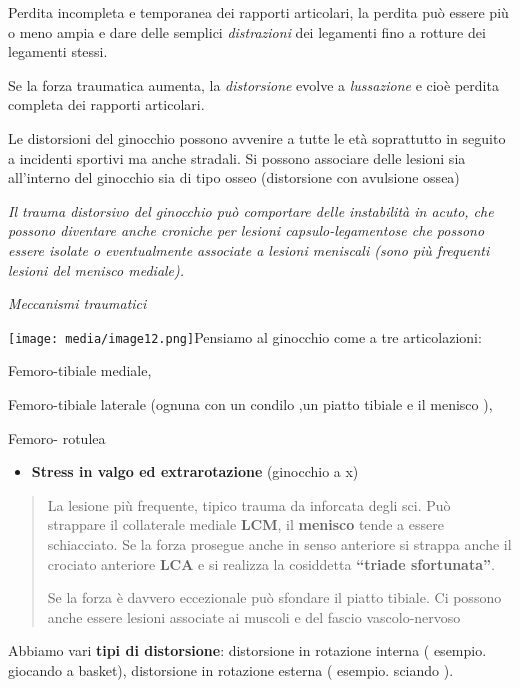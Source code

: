 \documentclass[]{article}
\begin{document}
Perdita incompleta e temporanea dei rapporti articolari, la perdita può
essere più o meno ampia e dare delle semplici \emph{distrazioni} dei
legamenti fino a rotture dei legamenti stessi.

Se la forza traumatica aumenta, la \emph{distorsione} evolve a
\emph{lussazione} e cioè perdita completa dei rapporti articolari.

Le distorsioni del ginocchio possono avvenire a tutte le età soprattutto
in seguito a incidenti sportivi ma anche stradali. Si possono associare
delle lesioni sia all'interno del ginocchio sia di tipo osseo
(distorsione con avulsione ossea)

\emph{Il trauma distorsivo del ginocchio può comportare delle
instabilità in acuto, che possono diventare anche croniche per lesioni
capsulo-legamentose che possono essere isolate o eventualmente associate
a lesioni meniscali (sono più frequenti lesioni del menisco mediale).}

\emph{Meccanismi traumatici }

\texttt{[image: media/image12.png]}Pensiamo
al ginocchio come a tre articolazioni:

Femoro-tibiale mediale,

Femoro-tibiale laterale (ognuna con un condilo ,un piatto tibiale e il
menisco ),

Femoro- rotulea

\begin{itemize}
\item
  \textbf{Stress in valgo ed extrarotazione} (ginocchio a x)
\end{itemize}

\begin{quote}
La lesione più frequente, tipico trauma da inforcata degli sci. Può
strappare il collaterale mediale \textbf{LCM}, il \textbf{menisco} tende
a essere schiacciato. Se la forza prosegue anche in senso anteriore si
strappa anche il crociato anteriore \textbf{LCA} e si realizza la
cosiddetta \textbf{``triade sfortunata''}.

Se la forza è davvero eccezionale può sfondare il piatto tibiale. Ci
possono anche essere lesioni associate ai muscoli e del fascio
vascolo-nervoso
\end{quote}

Abbiamo vari \textbf{tipi di distorsione}: distorsione in rotazione
interna ( esempio. giocando a basket), distorsione in rotazione esterna
( esempio. sciando ).
\end{document}
